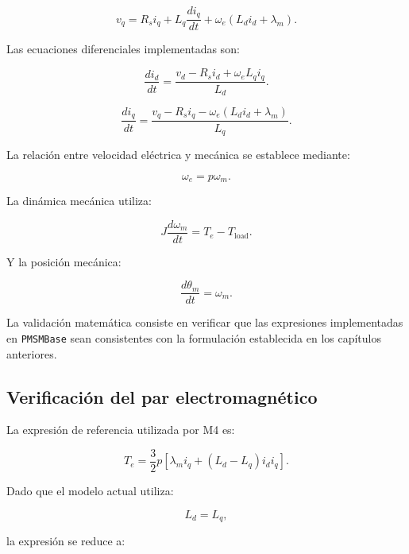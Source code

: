 \begin{equation}
v_q=
R_si_q+
L_q\frac{di_q}{dt}
+
\omega_e
\left(
L_di_d+\lambda_m
\right).
\end{equation}

Las ecuaciones diferenciales implementadas son:

\begin{equation}
\frac{di_d}{dt}
=
\frac{
v_d-R_si_d+\omega_eL_qi_q
}{
L_d
}.
\end{equation}

\begin{equation}
\frac{di_q}{dt}
=
\frac{
v_q-R_si_q-
\omega_e(L_di_d+\lambda_m)
}{
L_q
}.
\end{equation}

La relación entre velocidad eléctrica y mecánica se establece mediante:

\begin{equation}
\omega_e=p\omega_m.
\end{equation}

La dinámica mecánica utiliza:

\begin{equation}
J\frac{d\omega_m}{dt}
=
T_e-T_{\mathrm{load}}.
\end{equation}

Y la posición mecánica:

\begin{equation}
\frac{d\theta_m}{dt}
=
\omega_m.
\end{equation}

La validación matemática consiste en verificar que las expresiones implementadas en \texttt{PMSMBase} sean consistentes con la formulación establecida en los capítulos anteriores.

\subsection{Verificación del par electromagnético}

La expresión de referencia utilizada por M4 es:

\begin{equation}
T_e=
\frac{3}{2}p
\left[
\lambda_mi_q+
(L_d-L_q)i_di_q
\right].
\end{equation}

Dado que el modelo actual utiliza:

\begin{equation}
L_d=L_q,
\end{equation}

la expresión se reduce a:

